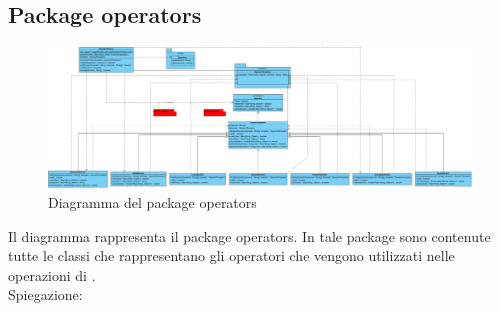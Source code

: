 \newpage

 

    \subsection{Package operators}

        \begin{figure}[htbp]
            \centering
            \includegraphics[width=\textwidth]{./img/DiagrammiClasse/operators.png}
            \caption[Diagramma del package operators]{Diagramma del package operators}
        \end{figure}
        Il diagramma rappresenta il package operators. In tale package sono contenute tutte le classi che rappresentano gli operatori che
        vengono utilizzati nelle operazioni di \ProjectName{}. \\
        Spiegazione:
